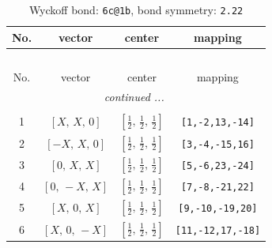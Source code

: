 \documentclass[fleqn,8pt]{jsarticle}
\begin{document}
\begin{longtable}{cccc}
\caption{Wyckoff bond: {\tt 6c@1b}, bond symmetry: {\tt 2.22}}
 \\
 \hline \hline
No. & vector & center & mapping \\ \hline \endfirsthead

\multicolumn{3}{l}{\tablename\ \thetable{}} \\
 \hline \hline
No. & vector & center & mapping \\ \hline \endhead

 \hline \hline
\multicolumn{3}{r}{\footnotesize\it continued ...} \\ \endfoot

 \hline \hline
\multicolumn{3}{r}{} \\ \endlastfoot

1 & $\left[ X,\, X,\, 0 \right]$ & $\left[ \frac{1}{2},\, \frac{1}{2},\, \frac{1}{2} \right]$ & {\tt [1,-2,13,-14]} \\ \hline
2 & $\left[ - X,\, X,\, 0 \right]$ & $\left[ \frac{1}{2},\, \frac{1}{2},\, \frac{1}{2} \right]$ & {\tt [3,-4,-15,16]} \\ \hline
3 & $\left[ 0,\, X,\, X \right]$ & $\left[ \frac{1}{2},\, \frac{1}{2},\, \frac{1}{2} \right]$ & {\tt [5,-6,23,-24]} \\ \hline
4 & $\left[ 0,\, - X,\, X \right]$ & $\left[ \frac{1}{2},\, \frac{1}{2},\, \frac{1}{2} \right]$ & {\tt [7,-8,-21,22]} \\ \hline
5 & $\left[ X,\, 0,\, X \right]$ & $\left[ \frac{1}{2},\, \frac{1}{2},\, \frac{1}{2} \right]$ & {\tt [9,-10,-19,20]} \\ \hline
6 & $\left[ X,\, 0,\, - X \right]$ & $\left[ \frac{1}{2},\, \frac{1}{2},\, \frac{1}{2} \right]$ & {\tt [11,-12,17,-18]} \\
\end{longtable}
\renewcommand{\arraystretch}{1.2}
\end{document}
